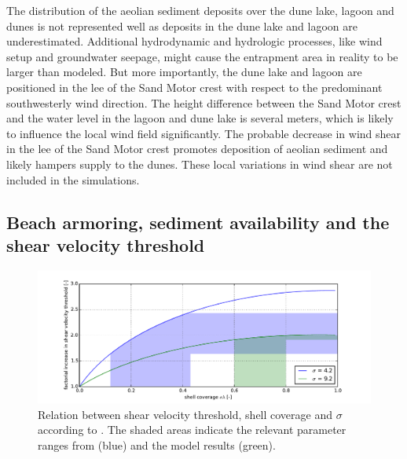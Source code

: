 The distribution of the aeolian sediment deposits over the dune lake,
lagoon and dunes is not represented well as deposits in the dune lake
and lagoon are underestimated. Additional hydrodynamic and hydrologic
processes, like wind setup and groundwater seepage, might cause the
entrapment area in reality to be larger than modeled. But more
importantly, the dune lake and lagoon are positioned in the lee of the
Sand Motor crest with respect to the predominant southwesterly wind
direction. The height difference between the Sand Motor crest and the
water level in the lagoon and dune lake is several meters, which is
likely to influence the local wind field significantly. The probable
decrease in wind shear in the lee of the Sand Motor crest promotes
deposition of aeolian sediment and likely hampers supply to the
dunes. These local variations in wind shear are not included in the
simulations.

\subsection{Beach armoring, sediment availability and the shear
  velocity threshold}


\begin{figure}
  \centering
\includegraphics[width=\columnwidth]{../Figures/sigma}
\caption{Relation between shear velocity threshold, shell coverage and
  $\sigma$ according to \citet[][Equation
  \ref{eq:raupach2}]{Raupach1993}. The shaded areas indicate the
  relevant parameter ranges from \citet{McKennaNeuman2012} (blue) and
  the model results (green).}
  \label{fig:sigma}
\end{figure}

